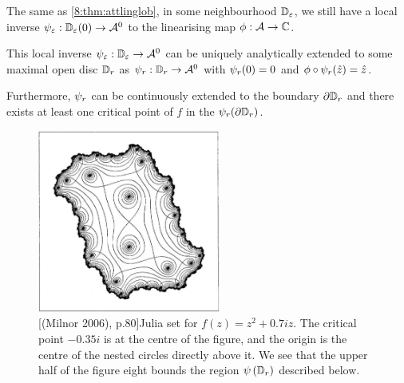 \documentclass[../main.tex]{subfiles}
\begin{document}
The same as \eqref{8:thm:attlinglob}, in some neighbourhood $\mathbb{D}_{\varepsilon}$, we still have a local inverse $\psi_{\varepsilon}:\mathbb{D}_{\varepsilon}(0) \to \mathcal{A}^{0}$ to the linearising map $\phi : \mathcal{A} \to \mathbb{C}$.

\begin{lem}
    \label{8:lem:inv}
    This local inverse $\psi_{\varepsilon}: \mathbb{D}_{\varepsilon} \to \mathcal{A}^{0}$ can be uniquely analytically extended to some maximal open disc $\mathbb{D}_{r}$ as $\psi_r: \mathbb{D}_{r} \to \mathcal{A}^{0}$ with $\psi_r(0)=0$ and $\phi\circ \psi_r(\hat{z}) = \hat{z}$. 
    
    Furthermore, $\psi_r$  can be continuously extended to the boundary $\partial \mathbb{D}_{r}$ and there exists at least one critical point of $f$ in the $\psi_r(\partial \mathbb{D}_{r})$.
\end{lem}
\begin{figure}
    \label{8:fig:julia}
    \centering
    \includegraphics[width=6cm]{resources/ch-08/graph-border.pdf}
    \caption{[(Milnor 2006), p.80]Julia set for $f(z)=z^2+0.7iz$. The critical point $-0.35i$ is at the centre of the figure, and the origin is the centre of the nested circles directly above it. We see that the upper half of the figure eight bounds the region $\psi\left(\mathbb{D}_r\right)$ described below.}
\end{figure}
\end{document}
